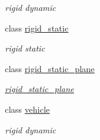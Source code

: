 \begin{DoxyCompactItemize}
\begin{DoxyCompactList}\small\item\em rigid dynamic \item\end{DoxyCompactList}\item 
class \hyperlink{classnebula_1_1content_1_1actor_1_1admin_1_1rigid__static}{rigid\_\-static}
\begin{DoxyCompactList}\small\item\em rigid static \item\end{DoxyCompactList}\item 
class \hyperlink{classnebula_1_1content_1_1actor_1_1admin_1_1rigid__static__plane}{rigid\_\-static\_\-plane}
\begin{DoxyCompactList}\small\item\em \hyperlink{classnebula_1_1content_1_1actor_1_1admin_1_1rigid__static__plane}{rigid\_\-static\_\-plane} \item\end{DoxyCompactList}\item 
class \hyperlink{classnebula_1_1content_1_1actor_1_1admin_1_1vehicle}{vehicle}
\begin{DoxyCompactList}\small\item\em rigid dynamic \item\end{DoxyCompactList}\end{DoxyCompactItemize}
